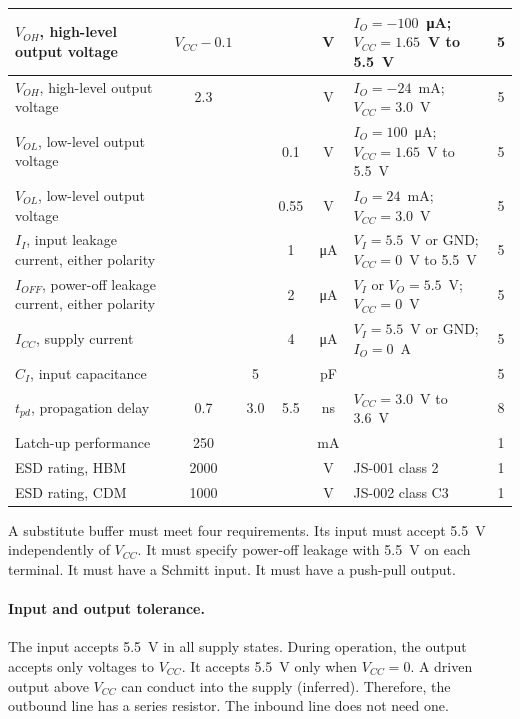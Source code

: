 {\begin{longtable}{|L{4.4cm}|c|c|c|c|L{3.4cm}|c|}
\hline
\(V_{OH}\), high-level output voltage & \(V_{CC}-0.1\) & & & \si{\volt} & \(I_O=-100\)~\si{\micro\ampere}; \(V_{CC}=1.65\)~V to \num{5.5}~V & 5 \\
\hline
\(V_{OH}\), high-level output voltage & \num{2.3} & & & \si{\volt} & \(I_O=-24\)~mA; \(V_{CC}=3.0\)~V & 5 \\
\hline
\(V_{OL}\), low-level output voltage & & & \num{0.1} & \si{\volt} & \(I_O=100\)~\si{\micro\ampere}; \(V_{CC}=1.65\)~V to \num{5.5}~V & 5 \\
\hline
\(V_{OL}\), low-level output voltage & & & \num{0.55} & \si{\volt} & \(I_O=24\)~mA; \(V_{CC}=3.0\)~V & 5 \\
\hline
\(I_I\), input leakage current, either polarity & & & \num{1} & \si{\micro\ampere} & \(V_I=5.5\)~V or GND; \(V_{CC}=0\)~V to \num{5.5}~V & 5 \\
\hline
\(I_{OFF}\), power-off leakage current, either polarity & & & \num{2} & \si{\micro\ampere} & \(V_I\) or \(V_O=5.5\)~V; \(V_{CC}=0\)~V & 5 \\
\hline
\(I_{CC}\), supply current & & & \num{4} & \si{\micro\ampere} & \(V_I=5.5\)~V or GND; \(I_O=0\)~A & 5 \\
\hline
\(C_I\), input capacitance & & \num{5} & & \si{\pico\farad} & & 5 \\
\hline
\(t_{pd}\), propagation delay & \num{0.7} & \num{3.0} & \num{5.5} & \si{\nano\second} & \(V_{CC}=3.0\)~V to \num{3.6}~V & 8 \\
\hline
Latch-up performance & \num{250} & & & \si{\milli\ampere} & & 1 \\
\hline
ESD rating, HBM & \num{2000} & & & \si{\volt} & JS-001 class 2 & 1 \\
\hline
ESD rating, CDM & \num{1000} & & & \si{\volt} & JS-002 class C3 & 1 \\
\hline
\end{longtable}
}

A substitute buffer must meet four requirements. Its input must accept
\SI{5.5}{\volt} independently of \(V_{CC}\). It must specify power-off leakage
with \SI{5.5}{\volt} on each terminal. It must have a Schmitt input. It must
have a push-pull output.

\paragraph{Input and output tolerance.} The input accepts \SI{5.5}{\volt} in
all supply states. During operation, the output accepts only voltages to
\(V_{CC}\). It accepts \SI{5.5}{\volt} only when \(V_{CC}=0\). A driven output
above \(V_{CC}\) can conduct into the supply (inferred). Therefore, the outbound
line has a series resistor. The inbound line does not need one.

